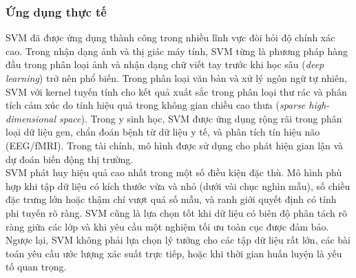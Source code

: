 \subsubsection{Ứng dụng thực tế}

SVM đã được ứng dụng thành công trong nhiều lĩnh vực đòi hỏi độ chính xác cao. Trong nhận dạng ảnh và thị giác máy tính, SVM từng là phương pháp hàng đầu trong phân loại ảnh và nhận dạng chữ viết tay trước khi học sâu (\textit{deep learning}) trở nên phổ biến. Trong phân loại văn bản và xử lý ngôn ngữ tự nhiên, SVM với kernel tuyến tính cho kết quả xuất sắc trong phân loại thư rác và phân tích cảm xúc do tính hiệu quả trong không gian chiều cao thưa (\textit{sparse high-dimensional space}). Trong y sinh học, SVM được ứng dụng rộng rãi trong phân loại dữ liệu gen, chẩn đoán bệnh từ dữ liệu y tế, và phân tích tín hiệu não (EEG/fMRI). Trong tài chính, mô hình được sử dụng cho phát hiện gian lận và dự đoán biến động thị trường.\\

SVM phát huy hiệu quả cao nhất trong một số điều kiện đặc thù. Mô hình phù hợp khi tập dữ liệu có kích thước vừa và nhỏ (dưới vài chục nghìn mẫu), số chiều đặc trưng lớn hoặc thậm chí vượt quá số mẫu, và ranh giới quyết định có tính phi tuyến rõ ràng. SVM cũng là lựa chọn tốt khi dữ liệu có biên độ phân tách rõ ràng giữa các lớp và khi yêu cầu một nghiệm tối ưu toàn cục được đảm bảo. Ngược lại, SVM không phải lựa chọn lý tưởng cho các tập dữ liệu rất lớn, các bài toán yêu cầu ước lượng xác suất trực tiếp, hoặc khi thời gian huấn luyện là yếu tố quan trọng.